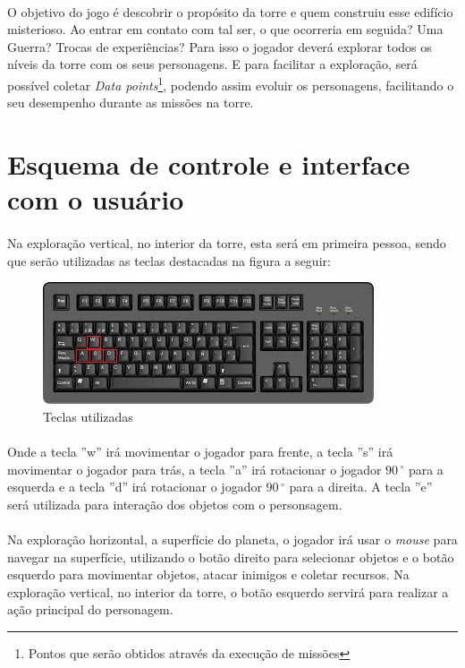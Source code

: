 \documentclass[11pt]{article} %
\begin{document}
\paragraph{}O objetivo do jogo é descobrir o propósito da torre e quem construiu esse edifício misterioso. Ao entrar em contato com tal ser, o que ocorreria em seguida? Uma Guerra? Trocas de experiências? Para isso o jogador deverá explorar todos os níveis da torre com os seus personagens. E para facilitar a exploração, será possível coletar \textit{Data points}\footnote{Pontos que serão obtidos através da execução de missões}, podendo assim evoluir os personagens, facilitando o seu desempenho durante as missões na torre. 

\section{Esquema de controle e interface com o usuário}

\paragraph{}Na exploração vertical, no interior da torre, esta será em primeira pessoa, sendo que serão utilizadas as teclas destacadas na figura a seguir:\\

\begin{figure}[!htp]
\centering
\includegraphics[scale=0.75]{res/keyboard.jpg}
\caption{Teclas utilizadas}
\label{Teclado}
\end{figure}

\paragraph{}Onde a tecla ''w'' irá movimentar o jogador para frente, a tecla ''s'' irá movimentar o jogador para trás, a tecla ''a'' irá rotacionar o jogador $90\,^{\circ}$ para a esquerda e a tecla ''d'' irá rotacionar o jogador $90\,^{\circ}$ para a direita. A tecla ''e'' será utilizada para interação dos objetos com o personsagem.

\paragraph{}Na exploração horizontal, a superfície do planeta, o jogador irá usar o \textit{mouse} para navegar na superfície, utilizando o botão direito para selecionar objetos e o botão esquerdo para movimentar objetos, atacar inimigos e coletar recursos. Na exploração vertical, no interior da torre, o botão esquerdo servirá para realizar a ação principal do personagem.
\end{document}
